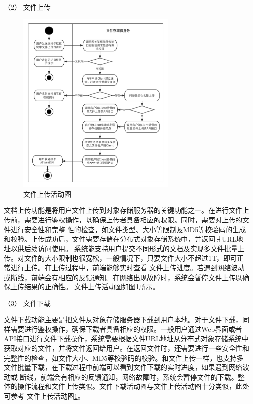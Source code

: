 （2） 文件上传

\begin{figure}[htb]
    \centering
    \includegraphics[width=0.7\textwidth]{my_figures/chapter4/文件上传活动图.png}
    \caption{文件上传活动图}
    \label{fig:文件上传活动图}
\end{figure}

文档上传功能是将用户文件上传到对象存储服务器的关键功能之一。在进行文件上传前，需要进行鉴权操作，以确保上传者具备相应的权限。同时，需要对上传的文件进行安全性和完整
性的检查，如文件类型、大小等限制及MD5等校验码的生成和校验。上传成功后，文件需要存储在分布式对象存储系统中，并返回其URL地址以供后续访问使用。
系统能支持用户提交不同形式的文档及实现多文件批量上传。对文件的大小限制也很宽松，一般情况下，只要文件大小不超过1T，即可正常进行上传。在上传过程中，前端能够实时查看
文件上传进度。若遇到网络波动或断线，前端会有相应的反馈通知。在网络出现故障时，系统会暂停文件上传以确保上传结果的正确性。
文件上传活动图如图\ref{fig:文件上传活动图}所示。



（3） 文件下载


文件下载功能主要是把文件从对象存储服务器下载到用户本地。对于文件下载，同样需要进行鉴权操作，确保下载者具备相应的权限。一般用户通过Web界面或者
API接口进行文件下载操作，系统需要根据文件URL地址从分布式对象存储系统中获取对应的文件，并将文件返回给用户。在返回文件时，还需要进行一些安全性和
完整性的检查，如文件大小、MD5等校验码的校验。和文件上传一样，也支持多文件批量下载，在下载过程中前端可以看到文件下载的实时进度，如果遇到网络波动或
断线，前端会有相应的反馈通知，网络故障时，系统会暂停文件的下载。整体的操作流程和文件上传类似。文件下载活动图与文件上传活动图十分类似，此处可参考
文件上传活动图\ref{fig:文件上传活动图}。

